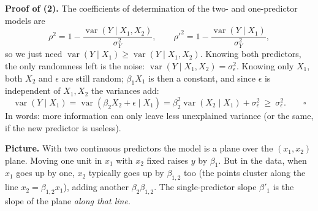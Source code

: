 \documentclass[11pt]{article}
\newcommand{\Var}{\operatorname{var}}
\newcommand{\given}{\mid}
\begin{document}
\textbf{Proof of (2).} The coefficients of determination of the two- and one-predictor models are
\[
\rho^2=1-\frac{\Var(Y\given X_1,X_2)}{\sigma_Y^2},\qquad \rho'^2=1-\frac{\Var(Y\given X_1)}{\sigma_Y^2},
\]
so we just need $\Var(Y\given X_1)\ge\Var(Y\given X_1,X_2)$. Knowing both predictors, the only randomness left is the noise:
$\Var(Y\given X_1,X_2)=\sigma_\epsilon^2$. Knowing only $X_1$, both $X_2$ and $\epsilon$ are still random; $\beta_1X_1$ is then a constant, and
since $\epsilon$ is independent of $X_1,X_2$ the variances add:
\[
\Var(Y\given X_1)=\Var(\beta_2X_2+\epsilon\given X_1)=\beta_2^2\Var(X_2\given X_1)+\sigma_\epsilon^2\ \ge\ \sigma_\epsilon^2. \qquad\square
\]
In words: more information can only leave less unexplained variance (or the same, if the new predictor is useless).

\textbf{Picture.} With two continuous predictors the model is a plane over the $(x_1,x_2)$ plane. Moving one unit in $x_1$ with $x_2$ fixed raises
$y$ by $\beta_1$. But in the data, when $x_1$ goes up by one, $x_2$ typically goes up by $\beta_{1,2}$ too (the points cluster along the line
$x_2=\beta_{1,2}x_1$), adding another $\beta_2\beta_{1,2}$. The single-predictor slope $\beta'_1$ is the slope of the plane \emph{along that line}.
\end{document}

